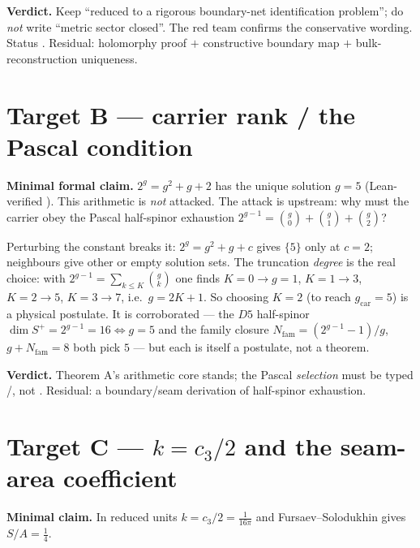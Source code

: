 \documentclass[11pt,a4paper]{article}
\newcommand{\cthree}{c_3}
\newcommand{\Nfam}{N_{\mathrm{fam}}}
\newcommand{\gcar}{g_{\mathrm{car}}}
\begin{document}
\noindent\textbf{Verdict.} Keep ``reduced to a rigorous boundary-net identification problem''; do
\emph{not} write ``metric sector closed''. The red team confirms the conservative wording. Status
\mC. Residual: holomorphy proof $+$ constructive boundary map $+$ bulk-reconstruction uniqueness.

\section*{Target B --- carrier rank / the Pascal condition}\label{sec:B}
\noindent\textbf{Minimal formal claim.} $2^{g}=g^2+g+2$ has the unique solution $g=5$ (Lean-verified
\mE). This arithmetic is \emph{not} attacked. The attack is upstream: why must the carrier obey the
Pascal half-spinor exhaustion $2^{g-1}=\binom{g}{0}+\binom{g}{1}+\binom{g}{2}$?

\begin{keybox}
Perturbing the constant breaks it: $2^{g}=g^2+g+c$ gives $\{5\}$ only at $c=2$; neighbours give
other or empty solution sets. The truncation \emph{degree} is the real choice: with
$2^{g-1}=\sum_{k\le K}\binom{g}{k}$ one finds $K{=}0\!\to\!g{=}1$, $K{=}1\!\to\!3$,
$K{=}2\!\to\!5$, $K{=}3\!\to\!7$, i.e.\ $g=2K+1$. So choosing $K=2$ (to reach $\gcar=5$) is a
physical postulate. It is corroborated --- the $D5$ half-spinor $\dim S^+=2^{g-1}=16\Leftrightarrow g=5$
and the family closure $\Nfam=(2^{g-1}{-}1)/g$, $g+\Nfam=8$ both pick $5$ --- but each is itself a
postulate, not a theorem.
\end{keybox}

\noindent\textbf{Verdict.} Theorem A's arithmetic core stands; the Pascal \emph{selection} must be
typed \mO/\mC, not \mE. Residual: a boundary/seam derivation of half-spinor exhaustion.

\section*{Target C --- $k=\cthree/2$ and the seam-area coefficient}\label{sec:C}
\noindent\textbf{Minimal claim.} In reduced units $k=\cthree/2=\tfrac{1}{16\pi}$ and
Fursaev--Solodukhin gives $S/A=\tfrac14$.
\end{document}
